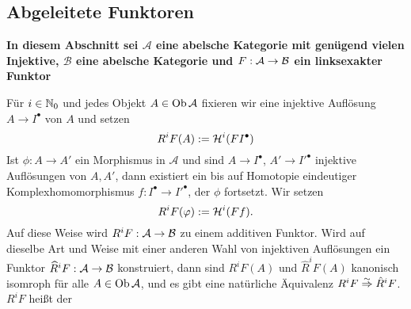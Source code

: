 \subsection{Abgeleitete Funktoren}
\begin{center}
	\textbf{In diesem Abschnitt sei $\mathcal{A}$ eine abelsche Kategorie mit genügend vielen Injektive, $\mathcal{B}$ eine abelsche Kategorie und $F:\mathcal{A} \to \mathcal{B}$ ein linksexakter Funktor}
\end{center}
\begin{bem+df}\label{8.1}
	Für $i\in \mathbb{N}_0$ und jedes Objekt $A\in \text{Ob}\,\mathcal{A}$ fixieren wir eine injektive Auflösung $A\to I^\bullet$ von $A$ und setzen 
	$$R^iF(A):= \mathcal{H}^i(FI^\bullet)$$
	Ist $\phi:A \to A'$ ein Morphismus in $\mathcal{A}$ und sind $A\to I^\bullet$, $A'\to I'^\bullet$ injektive Auflösungen von $A,A'$, dann existiert ein bis auf Homotopie eindeutiger Komplexhomomorphismus $f:I^\bullet \to I'^\bullet$, der $\phi$ fortsetzt. Wir setzen 
	$$R^iF(\varphi) := \mathcal{H}^i(Ff).$$
	Auf diese Weise wird $R^iF:\mathcal{A} \to \mathcal{B}$ zu einem additiven Funktor. Wird auf dieselbe Art und Weise mit einer anderen Wahl von injektiven Auflösungen ein Funktor $\widehat{R}^iF:\mathcal{A}\to \mathcal{B}$ konstruiert, dann sind $R^iF(A)$ und $\hat R^iF(A)$ kanonisch isomroph für alle $A\in \text{Ob}\,\mathcal{A}$, und es gibt eine natürliche Äquivalenz $R^iF\overset{\sim}{\Rightarrow} \hat R^iF$. $R^iF$ heißt der 
\end{bem+df}
